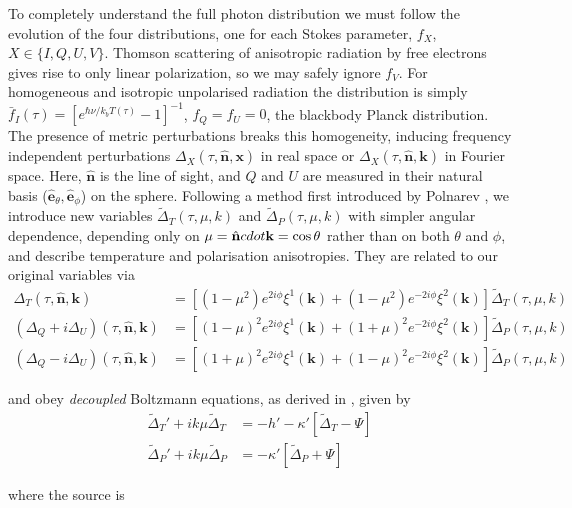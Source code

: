 \documentclass[a4paper,10pt]{article}
\renewcommand{\v}[1]{\mathbf{#1}}
\newcommand{\unit}[1]{\hat{\v{#1}}}
\begin{document}
To completely understand the full photon distribution we must follow the evolution of the four distributions, one for each Stokes parameter, $f_X$, $X\in\{I,Q,U,V\}$. Thomson scattering of anisotropic radiation by free electrons gives rise to only linear polarization, so we may safely ignore $f_V$. For homogeneous and isotropic unpolarised radiation the distribution is simply $\bar{f}_I(\tau)= [e^{\hbar \nu/k_b T(\tau)}-1]^{-1}$, $f_Q=f_U=0$, the blackbody Planck distribution. The presence of metric perturbations breaks this homogeneity, inducing frequency independent perturbations $\Delta_X(\tau,\unit{n},\v{x})$ in real space or $\Delta_X(\tau,\unit{n},\v{k})$ in Fourier space. Here, $\unit{n}$ is the line of sight, and $Q$ and $U$ are measured in their natural basis ($\unit{e}_\theta, \unit{e}_\phi$) on the sphere. Following a method first introduced by Polnarev \cite{polnarev}, we introduce new variables $\tilde{\Delta}_T(\tau,\mu,k)$ and $\tilde{\Delta}_P(\tau,\mu,k)$ with simpler angular dependence, depending only on $\mu=\unit{n}\\cdot\v{k}=\cos\theta$ rather than on both $\theta$  and $\phi$, and describe temperature and polarisation anisotropies. They are related to our original variables via
\begin{equation}\begin{split}
\Delta_T(\tau,\unit{n},\v{k}) &= [(1-\mu^2) e^{2i\phi} \xi^1(\v{k})+(1-\mu^2) e^{-2i\phi} \xi^2(\v{k})]\tilde{\Delta}_T(\tau,\mu,k)\\
(\Delta_Q+i\Delta_U)(\tau,\unit{n},\v{k}) &=[(1-\mu)^2 e^{2i\phi} \xi^1(\v{k})+(1+\mu)^2 e^{-2i\phi} \xi^2(\v{k})]\tilde{\Delta}_P(\tau,\mu,k) \\
(\Delta_Q-i\Delta_U)(\tau,\unit{n},\v{k}) &=[(1+\mu)^2 e^{2i\phi} \xi^1(\v{k})+(1-\mu)^2 e^{-2i\phi} \xi^2(\v{k})]\tilde{\Delta}_P(\tau,\mu,k)
\end{split}\end{equation}

and obey \textit{decoupled} Boltzmann equations, as derived in \cite{kowosky}, given by
\begin{equation}\begin{split}
\tilde{\Delta}_T'+ik\mu \tilde{\Delta}_T &= -h' -\kappa'[\tilde{\Delta}_T - \Psi]\\
\tilde{\Delta}_P'+ik\mu\tilde{\Delta}_P &= -\kappa'[\tilde{\Delta}_P + \Psi]
\end{split}
\label{Boltzmann}\end{equation}

where the source is
\end{document}
